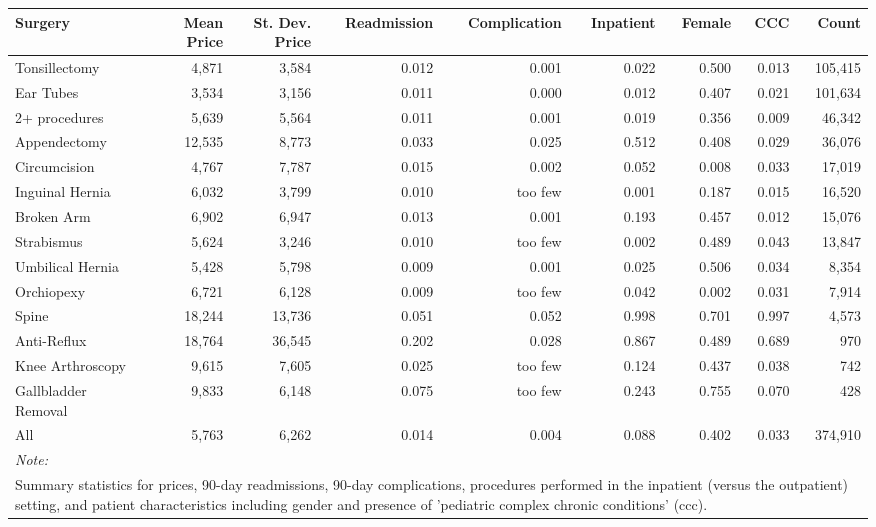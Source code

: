 \begin{table}[H]
\centering
\begin{tabular}{lrrrrrrrr}
\toprule
Surgery & Mean Price & St. Dev. Price & Readmission & Complication & Inpatient & Female & CCC & Count\\
\midrule
Tonsillectomy & 4,871 & 3,584 & 0.012 & 0.001 & 0.022 & 0.500 & 0.013 & 105,415\\
Ear Tubes & 3,534 & 3,156 & 0.011 & 0.000 & 0.012 & 0.407 & 0.021 & 101,634\\
2+ procedures & 5,639 & 5,564 & 0.011 & 0.001 & 0.019 & 0.356 & 0.009 & 46,342\\
Appendectomy & 12,535 & 8,773 & 0.033 & 0.025 & 0.512 & 0.408 & 0.029 & 36,076\\
Circumcision & 4,767 & 7,787 & 0.015 & 0.002 & 0.052 & 0.008 & 0.033 & 17,019\\
\addlinespace
Inguinal Hernia & 6,032 & 3,799 & 0.010 & too few & 0.001 & 0.187 & 0.015 & 16,520\\
Broken Arm & 6,902 & 6,947 & 0.013 & 0.001 & 0.193 & 0.457 & 0.012 & 15,076\\
Strabismus & 5,624 & 3,246 & 0.010 & too few & 0.002 & 0.489 & 0.043 & 13,847\\
Umbilical Hernia & 5,428 & 5,798 & 0.009 & 0.001 & 0.025 & 0.506 & 0.034 & 8,354\\
Orchiopexy & 6,721 & 6,128 & 0.009 & too few & 0.042 & 0.002 & 0.031 & 7,914\\
\addlinespace
Spine & 18,244 & 13,736 & 0.051 & 0.052 & 0.998 & 0.701 & 0.997 & 4,573\\
Anti-Reflux & 18,764 & 36,545 & 0.202 & 0.028 & 0.867 & 0.489 & 0.689 & 970\\
Knee Arthroscopy & 9,615 & 7,605 & 0.025 & too few & 0.124 & 0.437 & 0.038 & 742\\
Gallbladder Removal & 9,833 & 6,148 & 0.075 & too few & 0.243 & 0.755 & 0.070 & 428\\
All & 5,763 & 6,262 & 0.014 & 0.004 & 0.088 & 0.402 & 0.033 & 374,910\\
\bottomrule
\multicolumn{9}{l}{\rule{0pt}{1em}\textit{Note: }}\\
\multicolumn{9}{l}{\rule{0pt}{1em}Summary statistics for prices, 90-day readmissions, 90-day complications, procedures performed in the inpatient (versus the outpatient) setting, and patient characteristics including gender and presence of 'pediatric complex chronic conditions' (ccc).}\\
\end{tabular}
\end{table}
